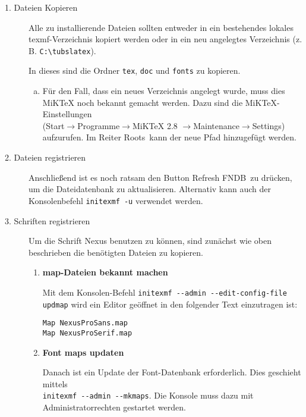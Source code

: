 \begin{description}
  \item[1. Dateien Kopieren]
  
    Alle zu installierende Dateien sollten entweder in ein bestehendes lokales
    texmf-Verzeichnis kopiert werden oder in ein neu angelegtes Verzeichnis
    (z.\,B. \lstinline{C:\tubslatex}).
    
    In dieses sind die Ordner \lstinline{tex}, \lstinline{doc} und 
    \lstinline{fonts} zu kopieren.
    
    \begin{enumerate}[a)]
      \item {\bfseries }
        
        Für den Fall, dass ein neues Verzeichnis angelegt wurde,
        muss dies MiKTeX noch bekannt gemacht werden.
        Dazu sind die MiKTeX-Einstellungen\\ (Start$\to$Programme$\to$MiKTeX 2.8 
        $\to$Maintenance$\to$Settings) aufzurufen.
        Im Reiter \glqq Roots\grqq\ kann der neue Pfad hinzugefügt werden.
    \end{enumerate}

  \item[2. Dateien registrieren]
    
    Anschließend ist es noch ratsam den Button \glqq Refresh FNDB\grqq\
    zu drücken, um die Dateidatenbank zu aktualisieren. Alternativ kann auch 
    der Konsolenbefehl \lstinline{initexmf -u} verwendet werden.
    
  \item[3. Schriften registrieren]
    Um die Schrift Nexus benutzen zu können, sind zunächst wie oben beschrieben
    die benötigten Dateien zu kopieren.
    
    \begin{enumerate}

      \item {\bfseries map-Dateien bekannt machen}

      Mit dem Konsolen-Befehl \lstinline{initexmf --admin --edit-config-file updmap}
      wird ein Editor geöffnet in den folgender Text einzutragen ist:

      \begin{lstlisting}
Map NexusProSans.map
Map NexusProSerif.map
      \end{lstlisting}

      \item {\bfseries Font maps updaten}

        Danach ist ein Update der Font-Datenbank erforderlich. Dies geschieht
        mittels\\ \lstinline{initexmf --admin --mkmaps}. Die Konsole muss dazu
        mit Administratorrechten gestartet werden.
        

\end{enumerate}
\end{description}
